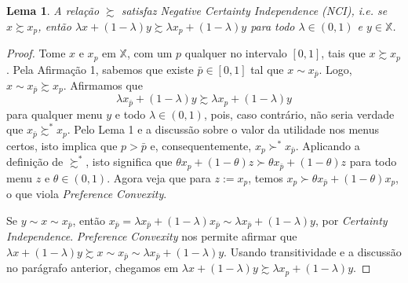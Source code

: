 \documentclass[11pt, a4paper]{article}
\theoremstyle{nonumberplain}
\newtheorem{proof}{Dem.}
\theoremstyle{plain}
\theoremstyle{plain}
\newtheorem{lemma}{Lema}
\begin{document}
\begin{lemma}A relação $\succsim$ satisfaz \emph{Negative Certainty Independence (NCI)}, i.e. se $x\succsim x_p$, então $\lambda x +(1-\lambda)y\succsim \lambda x_p +(1-\lambda)y$ para todo $\lambda\in(0,1)$ e $y\in \mathbb{X}$.\end{lemma}
\begin{proof}
Tome $x$ e $x_p$ em $\mathbb{X}$, com um $p$ qualquer no intervalo $[0,1]$, tais que $x\succsim x_p$. Pela Afirmação 1, sabemos que existe $\bar{p}\in [0,1]$ tal que $x\sim x_{\bar{p}}$. Logo, $x\sim x_{\bar{p}}\succsim x_p$. Afirmamos que $$\lambda x_{\bar{p}} +(1-\lambda)y\succsim \lambda x_p +(1-\lambda)y$$
para qualquer menu $y$ e todo $\lambda\in (0,1)$, pois, caso contrário, não seria verdade que $x_{\bar{p}}\succsim^*x_p$. Pelo Lema 1 e a discussão sobre o valor da utilidade nos menus certos, isto implica que $p>\bar{p}$ e, consequentemente, $x_p\succ^*x_{\bar{p}}$. Aplicando a definição de $\succsim^*$, isto significa que $\theta x_p + (1-\theta)z\succ \theta x_{\bar{p}}+(1-\theta)z$ para todo menu $z$ e $\theta\in (0,1)$. Agora veja que para $z:=x_p$, temos $x_p\succ \theta x_{\bar{p}} + (1-\theta)x_p$, o que viola \emph{Preference Convexity}.

Se $y\sim x\sim x_{\bar{p}}$, então $x_{\bar{p}}=\lambda x_{\bar{p}} + (1-\lambda)x_{\bar{p}}\sim\lambda x_{\bar{p}}+(1-\lambda)y$, por \emph{Certainty Independence}. \emph{Preference Convexity} nos permite afirmar que $\lambda x+(1-\lambda)y \succsim x \sim x_{\bar{p}} \sim \lambda x_{\bar{p}}+(1-\lambda)y$. Usando transitividade e a discussão no parágrafo anterior, chegamos em $\lambda x+(1-\lambda)y\succsim \lambda x_p + (1-\lambda)y$. 


\end{proof}
\end{document}

